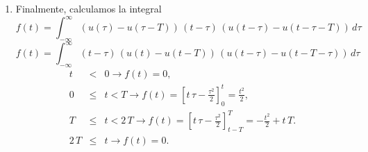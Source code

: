 \begin{enumerate}
\item Finalmente, calculamos la integral
\begin{equation}
        f\left( t\right) =
        \int_{-\infty}^{\infty}    
                \left( u\left( \tau\right) -u\left(\tau-T\right) \right) \,
                \left( t-\tau \right) \, \left( u\left( t-\tau \right) -u\left( t-\tau-T\right) \right) 
        \, d\tau
\end{equation}
\begin{equation}
        f\left( t\right) =
        \int_{-\infty}^{\infty}
                \left( t-\tau \right) \, \left( u\left( t\right)-u\left( t-T\right) \right) \, 
                \left( u\left( t-\tau \right) -u\left( t-T-\tau \right) \right) \, d\tau
\end{equation}
\begin{eqnarray}
        t &<&0  \rightarrow f\left( t\right) =0,                                                     \\
        0 &\leq &t<T\rightarrow f\left( t\right) =
        \left[ t \, \tau -\frac{\tau ^{2}}{2}\right] _{0}^{t}=\frac{t^{2}}{2},            \\
        T &\leq &t<2 \, T\rightarrow f\left( t\right) =
        \left[ t \, \tau -\frac{\tau ^{2}}{2}\right] _{t-T}^{T}=-\frac{t^{2}}{2}+t \, T.     \\
        2 \, T &\leq &t\rightarrow f\left( t\right) =0.
\end{eqnarray}

\end{enumerate}
